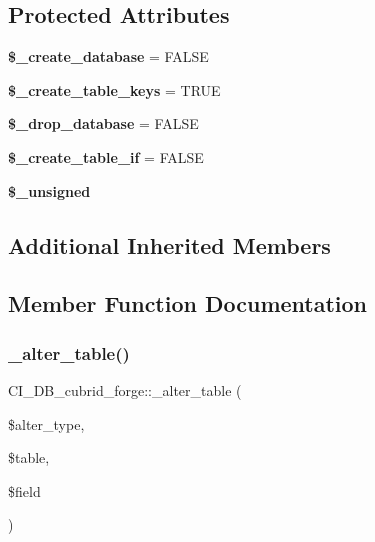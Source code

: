 \subsection*{Protected Attributes}
\begin{DoxyCompactItemize}
\item 
\mbox{\label{class_c_i___d_b__cubrid__forge_a1f271b9b8f33a4e6675b098db017e5d2}} 
{\bfseries \$\+\_\+create\+\_\+database} = F\+A\+L\+SE
\item 
\mbox{\label{class_c_i___d_b__cubrid__forge_a0e23fd8263da632a7ffce1f9ef350ab2}} 
{\bfseries \$\+\_\+create\+\_\+table\+\_\+keys} = T\+R\+UE
\item 
\mbox{\label{class_c_i___d_b__cubrid__forge_a12c1640f3e9516c493005cb1e89e4150}} 
{\bfseries \$\+\_\+drop\+\_\+database} = F\+A\+L\+SE
\item 
\mbox{\label{class_c_i___d_b__cubrid__forge_a42e9f86e81c71ae3faa037f77e47472b}} 
{\bfseries \$\+\_\+create\+\_\+table\+\_\+if} = F\+A\+L\+SE
\item 
{\bfseries \$\+\_\+unsigned}
\end{DoxyCompactItemize}
\subsection*{Additional Inherited Members}


\subsection{Member Function Documentation}
\mbox{\label{class_c_i___d_b__cubrid__forge_aef4960cd83bcab5640b24a890d2ef9ce}} 
\subsubsection{\texorpdfstring{\+\_\+alter\+\_\+table()}{\_alter\_table()}}
{\footnotesize\ttfamily C\+I\+\_\+\+D\+B\+\_\+cubrid\+\_\+forge\+::\+\_\+alter\+\_\+table (\begin{DoxyParamCaption}\item[{}]{\$alter\+\_\+type,  }\item[{}]{\$table,  }\item[{}]{\$field }\end{DoxyParamCaption})\hspace{0.3cm}{\ttfamily [protected]}}

